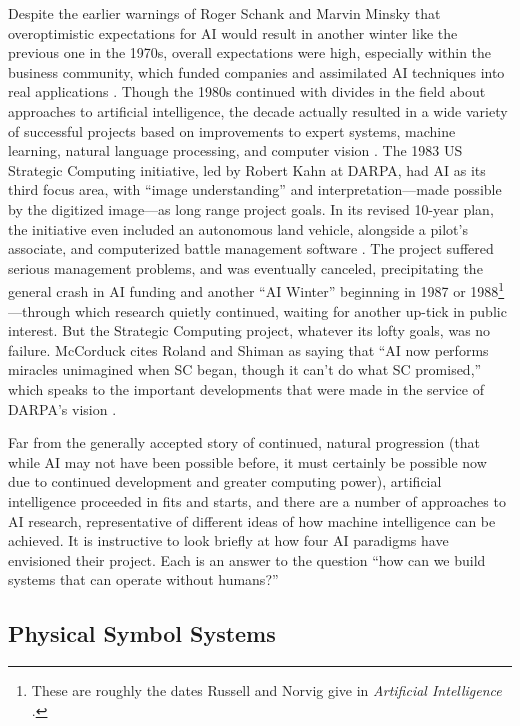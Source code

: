 Despite the
earlier warnings of Roger Schank and Marvin Minsky that overoptimistic
expectations for AI would result in another winter like the previous
one in the 1970s, overall expectations were high, especially within
the business community, which funded companies and assimilated AI
techniques into real applications \cite[Afterword]{mccorduck}. Though
the 1980s continued with divides in 
the field about approaches to artificial intelligence, the decade
actually resulted in a wide variety of successful projects based on
improvements to expert systems, machine learning, natural language
processing, and computer vision \cite[Afterword]{mccorduck}. The 1983 US Strategic Computing
initiative, led by Robert Kahn at DARPA, had AI as its third focus
area, with ``image understanding'' and interpretation---made possible by
the digitized image---as long range project goals. In its revised
10-year plan, the initiative even included an autonomous land vehicle,
alongside a pilot's associate, and computerized battle management
software \cite{rolandShiman}. The project suffered serious management problems, and
was eventually canceled, precipitating the general crash in AI
funding and another ``AI Winter'' beginning in 1987 or
1988\footnote{These are roughly the dates Russell and Norvig give in
  \emph{Artificial Intelligence} \cite{russellnorvig}.}---through which research quietly continued, waiting for another
up-tick in public interest. But the Strategic Computing project,
whatever its lofty goals, was no failure. McCorduck cites Roland and
Shiman as saying that ``AI now performs miracles unimagined when SC
began, though it can't do what SC promised,'' which speaks to the
important developments that were made in the service of DARPA's vision
\cite[Afterword]{mccorduck}.

Far from the generally accepted story of continued, natural
progression (that while AI may not have been possible before, it must
certainly be possible now due to continued development and greater
computing power), artificial intelligence proceeded in fits and
starts, and there are a number of approaches to AI research,
representative of different
ideas of how machine intelligence can be achieved. It is instructive
to look briefly at how four AI paradigms have envisioned their project.
Each is an answer to the question ``how can we build systems that
can operate without humans?''

\subsection{Physical Symbol Systems}

